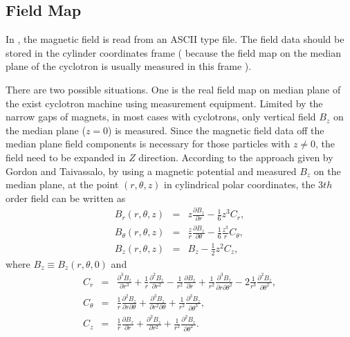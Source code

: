 \subsection{Field Map}
\label{sec:opalcycl:fildmap}
In \opalcycl, the magnetic field is read from an ASCII type file. The field data should be stored in the cylinder coordinates frame
( because the field map on the median plane of the cyclotron is usually measured in this frame ). 

There are two possible situations. One is the real field map on median plane of the exist cyclotron machine using measurement equipment.
Limited by the narrow gaps of magnets, in most cases with cyclotrons, only vertical field $B_z$ on the median plane ($z=0$) is measured.
Since the magnetic field data off the median plane field components is necessary for those particles with $z \neq 0$, the field need to be expanded in $Z$ direction. 
According to the approach given by Gordon and Taivassalo, by using a magnetic potential and measured $B_z$ on the median plane, 
at the point $(r,\theta, z)$ in cylindrical polar coordinates, the 3$th$ order field can be written as    
\begin{eqnarray}\label{eq:Bfield}
  B_r(r,\theta, z) & = & z\frac{\partial B_z}{\partial r}-\frac{1}{6}z^3 C_r, \nonumber\\    
  B_\theta(r,\theta, z) & = & \frac{z}{r}\frac{\partial B_z}{\partial \theta}-\frac{1}{6}\frac{z^3}{r} C_{\theta}, \\     
  B_z(r,\theta, z) & = & B_z-\frac{1}{2}z^2 C_z,  \nonumber    
\end{eqnarray}
where $B_z\equiv B_z(r, \theta, 0)$ and  
\begin{eqnarray}\label{eq:Bcoeff}
  C_r & = & \frac{\partial^3B_z}{\partial r^3} + \frac{1}{r}\frac{\partial^2 B_z}{\partial r^2} - \frac{1}{r^2}\frac{\partial B_z}{\partial r} 
        + \frac{1}{r^2}\frac{\partial^3 B_z}{\partial r \partial \theta^2} - 2\frac{1}{r^3}\frac{\partial^2 B_z}{\partial \theta^2}, \nonumber  \\    
  C_{\theta} & = & \frac{1}{r}\frac{\partial^2 B_z}{\partial r \partial \theta} + \frac{\partial^3 B_z}{\partial r^2 \partial \theta}
        + \frac{1}{r^2}\frac{\partial^3 B_z}{\partial \theta^3},  \\
  C_z & = & \frac{1}{r}\frac{\partial B_z}{\partial r} + \frac{\partial^2 B_z}{\partial r^2} + \frac{1}{r^2}\frac{\partial^2 B_z}{\partial \theta^2}. \nonumber
\end{eqnarray}

